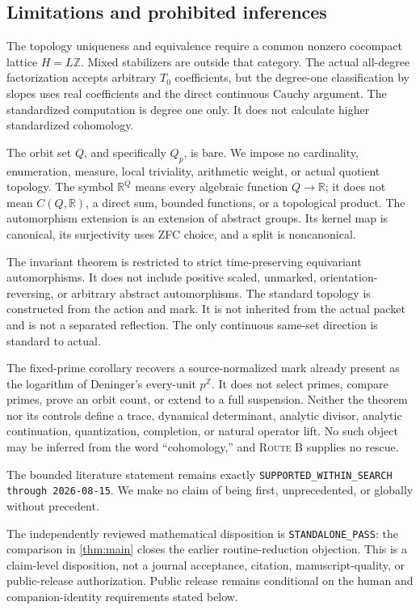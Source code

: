\documentclass[11pt]{article}
\theoremstyle{definition}
\newcommand{\R}{\mathbb R}
\newcommand{\Z}{\mathbb Z}
\newcommand{\RouteB}{\textsc{Route B}}
\begin{document}
\subsection{Limitations and prohibited inferences}
\label{sec:limitations}

The topology uniqueness and equivalence require a common nonzero cocompact
lattice $H=L\Z$.  Mixed stabilizers are outside that category.  The actual
all-degree factorization accepts arbitrary $T_0$ coefficients, but the
degree-one classification by slopes uses real coefficients and the direct
continuous Cauchy argument.  The standardized computation is degree one
only.  It does not calculate higher standardized cohomology.

The orbit set $Q$, and specifically $Q_p$, is bare.  We impose no
cardinality, enumeration, measure, local triviality, arithmetic weight, or
actual quotient topology.  The symbol $\R^Q$ means every algebraic function
$Q\to\R$; it does not mean $C(Q,\R)$, a direct sum, bounded functions, or a
topological product.  The automorphism extension is an extension of
abstract groups.  Its kernel map is canonical, its surjectivity uses ZFC
choice, and a split is noncanonical.

The invariant theorem is restricted to strict time-preserving equivariant
automorphisms.  It does not include positive scaled, unmarked,
orientation-reversing, or arbitrary abstract automorphisms.  The standard
topology is constructed from the action and mark.  It is not inherited from
the actual packet and is not a separated reflection.  The only continuous
same-set direction is standard to actual.

The fixed-prime corollary recovers a source-normalized mark already present
as the logarithm of Deninger's every-unit $p^{\Z}$.  It does not select primes,
compare primes, prove an orbit count, or extend to a full suspension.
Neither the theorem nor its controls define a trace, dynamical determinant,
analytic divisor, analytic continuation, quantization, completion, or
natural operator lift.  No such object may be inferred from the word
``cohomology,'' and \RouteB{} supplies no rescue.

The bounded literature statement remains exactly
\texttt{SUPPORTED\_WITHIN\_SEARCH through 2026-08-15}.  We make no claim of
being first, unprecedented, or globally without precedent.

The independently reviewed mathematical disposition is
\texttt{STANDALONE\_PASS}: the comparison in \cref{thm:main} closes the
earlier routine-reduction objection.  This is a claim-level disposition, not
a journal acceptance, citation, manuscript-quality, or public-release
authorization.  Public release remains conditional on the human and
companion-identity requirements stated below.
\end{document}
